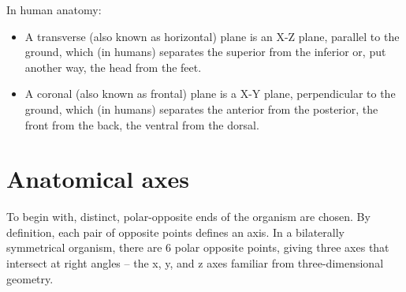 \documentclass[]{book}
\providecommand{\tightlist}{%
  \setlength{\itemsep}{0pt}\setlength{\parskip}{0pt}}
\begin{document}
In human anatomy:

\begin{itemize}
\tightlist
\item
  A transverse (also known as horizontal) plane is an X-Z plane, parallel to the ground, which (in humans) separates the superior from the inferior or, put another way, the head from the feet.
\item
  A coronal (also known as frontal) plane is a X-Y plane, perpendicular to the ground, which (in humans) separates the anterior from the posterior, the front from the back, the ventral from the dorsal.
\end{itemize}

\hypertarget{anatomical-axes}{%
\section{Anatomical axes}\label{anatomical-axes}}

To begin with, distinct, polar-opposite ends of the organism are chosen. By definition, each pair of opposite points defines an axis. In a bilaterally symmetrical organism, there are 6 polar opposite points, giving three axes that intersect at right angles -- the x, y, and z axes familiar from three-dimensional geometry.
\end{document}
